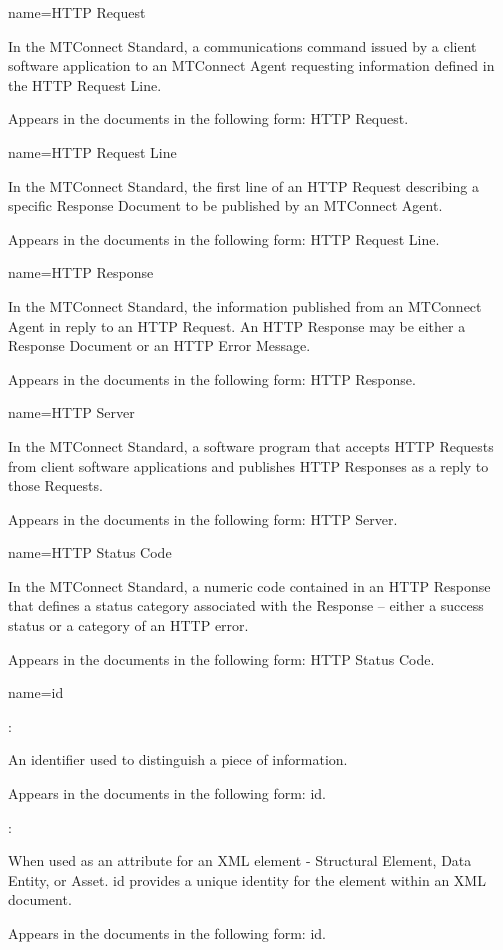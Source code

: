 {
  name={HTTP Request}
}
{
	In the MTConnect Standard, a communications command issued by a client software application to an MTConnect Agent requesting information defined in the HTTP Request Line.

	Appears in the documents in the following form: HTTP Request.
}


{
  name={HTTP Request Line}
}
{
	In the MTConnect Standard, the first line of an HTTP Request describing a specific Response Document to be published by an MTConnect Agent.

	Appears in the documents in the following form: HTTP Request Line.
}


{
  name={HTTP Response}
}
{
	In the MTConnect Standard, the information published from an MTConnect Agent in reply to an HTTP Request.  An HTTP Response may be either a Response Document or an HTTP Error Message.

	Appears in the documents in the following form: HTTP Response.
}


{
  name={HTTP Server}
}
{
	In the MTConnect Standard, a software program that accepts HTTP Requests from client software applications and publishes HTTP Responses as a reply to those Requests.

	Appears in the documents in the following form: HTTP Server.
}


{
  name={HTTP Status Code}
}
{
	In the MTConnect Standard, a numeric code contained in an HTTP Response that defines a status category associated with the Response – either a success status or a category of an HTTP error.  

	Appears in the documents in the following form: HTTP Status Code.
}


{
  name={id}
}
{
	:

	An identifier used to distinguish a piece of information.

	Appears in the documents in the following form: id.

	:

	When used as an attribute for an XML element - Structural Element, Data Entity, or Asset.  id provides a unique identity for the element within an XML document.

	Appears in the documents in the following form: id.
}


